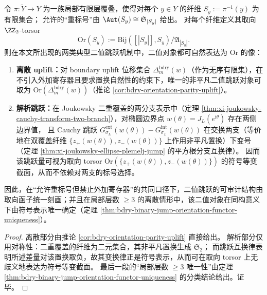 \begin{theorem}\label{thm:xi-binary-jump-orientation-unification}
令 \(\pi:\widetilde Y\to Y\) 为一族局部有限层覆叠，使得对每个 \(y\in Y\) 的纤维 \(S_y:=\pi^{-1}(y)\) 为有限集合；
允许的“重标号”由 \(\Aut(S_y)\cong \mathfrak S_{|S_y|}\) 给出。
对每个纤维定义其取向 \(\ZZ_2\)-torsor
\[
\mathrm{Or}(S_y):=\mathrm{Bij}([|S_y|],S_y)\big/\mathfrak A_{|S_y|}.
\]
则在本文所出现的两类典型二值跳跃机制中，二值对象都可自然表达为 \(\mathrm{Or}\) 的像：
\begin{enumerate}
\normalfont
  \item \textbf{离散 uplift：}对 boundary uplift 位移集合 \(\Delta_m^{\mathrm{bdry}}(w)\)（作为无序有限集），在不引入外加寄存器且要求置换自然性的约束下，唯一的非平凡二值跳跃对象可取为
  \(\mathrm{Or}(\Delta_m^{\mathrm{bdry}}(w))\)（推论 \ref{cor:bdry-orientation-parity-uplift}）。
  \item \textbf{解析跳跃：}在 Joukowsky 二重覆盖的两分支表示中（定理 \ref{thm:xi-joukowsky-cauchy-transform-two-branch}），对椭圆边界点 \(w(\theta)=J_L(e^{\mathrm{i}\theta})\) 存在两侧边界值，
  且 Cauchy 跳跃
  \(
  G_{\sigma_L}^{\mathrm{ext}}(w(\theta))-G_{\sigma_L}^{\mathrm{int}}(w(\theta))
  \)
  在交换两支（等价地在双覆盖纤维 \(\{z_+(w(\theta)),z_-(w(\theta))\}\) 上作用非平凡置换）下变号（定理 \ref{thm:xi-joukowsky-ellipse-plemelj-jump} 的平方根分支互换律）。
因而该跳跃量可视为取向 torsor \(\mathrm{Or}(\{z_+(w(\theta)),z_-(w(\theta))\})\) 的符号等变截面，从而不依赖对两支的标号选择。
\end{enumerate}
因此，在“允许重标号但禁止外加寄存器”的共同口径下，二值跳跃的可审计结构由取向函子统一刻画；并且在局部层数 \(\ge 3\) 的离散情形中，该二值对象在同构意义下由符号表示唯一确定（定理 \ref{thm:bdry-binary-jump-orientation-functor-uniqueness}）。
\end{theorem}

\begin{proof}
离散部分由推论 \ref{cor:bdry-orientation-parity-uplift} 直接给出。
解析部分仅用对称性：二重覆盖的纤维为二元集合，其非平凡置换生成 \(\mathfrak S_2\)；
而跳跃互换律表明所述差量对该置换取负，故其变换律正是符号表示，从而可在取向 torsor 上无歧义地表达为符号等变截面。
最后一段的“局部层数 \(\ge 3\) 唯一性”由定理 \ref{thm:bdry-binary-jump-orientation-functor-uniqueness} 的分类结论给出。证毕。
\end{proof}

